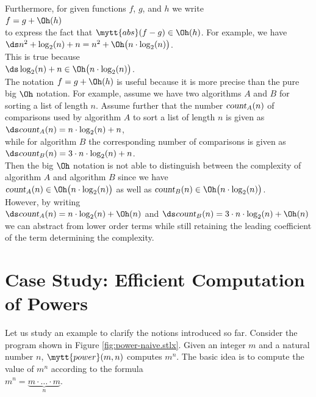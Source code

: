 Furthermore, for given functions $f$, $g$, and $h$ we write
\\[0.2cm]
\hspace*{1.3cm}
$f = g + \Oh(h)$
\\[0.2cm]
to express the fact that  $\mytt{abs}(f - g) \in \Oh(h)$.  For example, we have 
\\[0.2cm]
\hspace*{1.3cm}
$\ds n^2 + \log_2(n) + n = n^2 + \Oh\bigl(n \cdot \log_2(n)\bigr)$.
\\[0.2cm]
This is true because
\\[0.2cm]
\hspace*{1.3cm}
$\ds \log_2(n) + n \in \Oh\bigl(n \cdot \log_2(n)\bigr)$.
\\[0.2cm] 
The notation $f = g + \Oh(h)$ is useful because it is more precise than the pure big $\Oh$
notation.  For example, assume we have two algorithms $A$ and $B$ for sorting a list of length
$n$.  Assume further that the number $\textsl{count}_A(n)$ of comparisons used by algorithm $A$ to sort a list of
length $n$ is given as
\\[0.2cm]
\hspace*{1.3cm}
$\ds\textsl{count}_A(n) = n \cdot \log_2(n) + n$,
\\[0.2cm]
while for algorithm $B$ the corresponding number of comparisons is given as
\\[0.2cm]
\hspace*{1.3cm}
$\ds\textsl{count}_B(n) = 3 \cdot n \cdot \log_2(n) + n$.
\\[0.2cm]
Then the big $\Oh$ notation is not able to distinguish between the complexity of algorithm $A$ and
algorithm $B$ since we have
\\[0.2cm]
\hspace*{1.3cm}
$\textsl{count}_A(n) \in \Oh\bigl(n \cdot \log_2(n)\bigr)$ \quad as well as \quad
$\textsl{count}_B(n) \in \Oh\bigl(n \cdot \log_2(n)\bigr)$.
\\[0.2cm]
However, by writing
\\[0.2cm]
\hspace*{1.3cm}
$\ds\textsl{count}_A(n) = n \cdot \log_2(n) + \Oh(n)$ \quad and \quad
$\ds\textsl{count}_B(n) = 3 \cdot n \cdot \log_2(n) + \Oh(n)$
\\[0.2cm]
we can abstract from lower order terms while still retaining the leading coefficient of the term
determining the complexity.  

\section[Computation of Powers]{Case Study:  Efficient Computation of Powers}
Let us study an example to clarify the notions introduced so far.  
Consider the program shown in Figure \ref{fig:power-naive.stlx}.  Given an integer $m$ and a
natural number $n$, $\mytt{power}(m, n)$ computes $m^n$.
The basic idea is to compute the value of $m^n$ according to the formula \\[0.2cm]
\hspace*{1.3cm} 
$m^n = \underbrace{m \cdot {\dots} \cdot m}_n$. 


